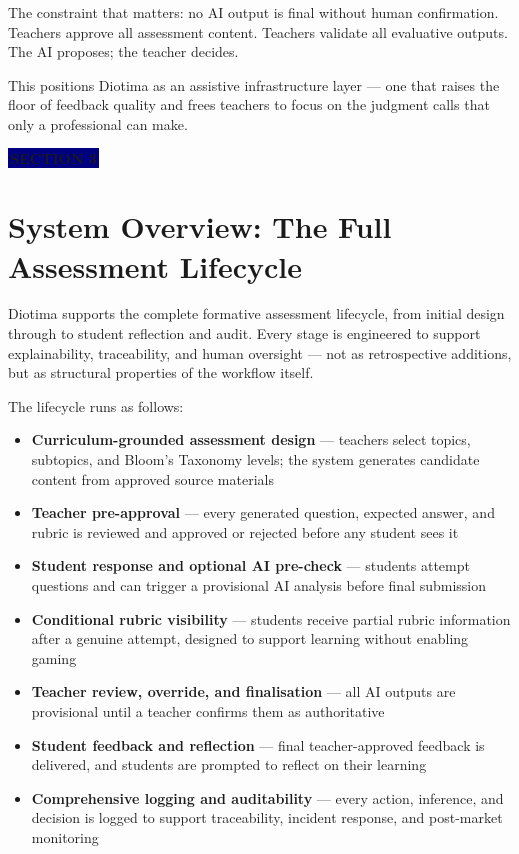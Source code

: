 \documentclass[11pt, a4paper]{article}
\newcommand{\sectiontag}[1]{%
  \vspace{4pt}%
  {\color{white}\colorbox{navy}{\small\bfseries\,#1\,}}%
  \vspace{6pt}%
}
\begin{document}
The constraint that matters: no AI output is final without human confirmation. Teachers approve all assessment content. Teachers validate all evaluative outputs. The AI proposes; the teacher decides.

This positions Diotima as an assistive infrastructure layer --- one that raises the floor of feedback quality and frees teachers to focus on the judgment calls that only a professional can make.

\sectiontag{SECTION 3}

\section{System Overview: The Full Assessment Lifecycle}

Diotima supports the complete formative assessment lifecycle, from initial design through to student reflection and audit. Every stage is engineered to support explainability, traceability, and human oversight --- not as retrospective additions, but as structural properties of the workflow itself.

The lifecycle runs as follows:

\begin{itemize}
  \item \textbf{Curriculum-grounded assessment design} --- teachers select topics, subtopics, and Bloom's Taxonomy levels; the system generates candidate content from approved source materials
  \item \textbf{Teacher pre-approval} --- every generated question, expected answer, and rubric is reviewed and approved or rejected before any student sees it
  \item \textbf{Student response and optional AI pre-check} --- students attempt questions and can trigger a provisional AI analysis before final submission
  \item \textbf{Conditional rubric visibility} --- students receive partial rubric information after a genuine attempt, designed to support learning without enabling gaming
  \item \textbf{Teacher review, override, and finalisation} --- all AI outputs are provisional until a teacher confirms them as authoritative
  \item \textbf{Student feedback and reflection} --- final teacher-approved feedback is delivered, and students are prompted to reflect on their learning
  \item \textbf{Comprehensive logging and auditability} --- every action, inference, and decision is logged to support traceability, incident response, and post-market monitoring
\end{itemize}
\end{document}
